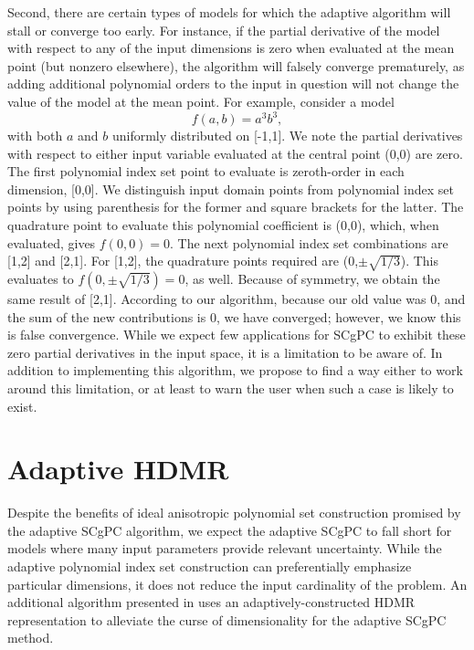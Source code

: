 Second, there are certain types of models for which the adaptive algorithm will stall or converge too early.
For instance, if the partial derivative of the model with respect to any of the
input dimensions is zero when evaluated at the mean point (but nonzero elsewhere), the algorithm will falsely
converge prematurely, as adding additional polynomial orders to the input in question will not change the
value of the model at the mean point.  For example, consider a model
\begin{equation}
  f(a,b) = a^3b^3,
\end{equation}
with both $a$ and $b$ uniformly distributed on [-1,1].  We note the partial derivatives with respect to either
input variable evaluated at the central point (0,0) are zero.  The first polynomial index set point to
evaluate is zeroth-order in each dimension, [0,0].  We distinguish input domain points from polynomial index
set points by using parenthesis for the former and square brackets for the latter. The quadrature point to
evaluate this polynomial coefficient is (0,0), which, when evaluated, gives $f(0,0)=0$.  The next polynomial
index set combinations are [1,2] and [2,1].  For [1,2], the quadrature points required are
(0,$\pm\sqrt{1/3}$).  This evaluates to $f(0,\pm\sqrt{1/3})=0$, as well.  Because of symmetry, we obtain the
same result of [2,1].  According to our algorithm, because our old value was 0, and the sum of the new
contributions is 0, we have converged; however, we know this is false convergence.  While we expect few
applications for SCgPC to exhibit these zero partial derivatives in the input space, it is a limitation to be
aware of.  In addition to implementing this algorithm, we propose to find a way either to work around this
limitation, or at least to warn the user when such a case is likely to exist.


\section{Adaptive HDMR}
Despite the benefits of ideal anisotropic polynomial set construction promised by the adaptive SCgPC
algorithm, we expect the adaptive SCgPC to fall short for models where many input parameters provide relevant
uncertainty.  While the adaptive polynomial index set construction can preferentially emphasize particular
dimensions, it does not reduce the input cardinality of the problem.  An additional algorithm presented in
\cite{Ayres} uses an adaptively-constructed HDMR representation to alleviate the curse of dimensionality for
the adaptive SCgPC method.

